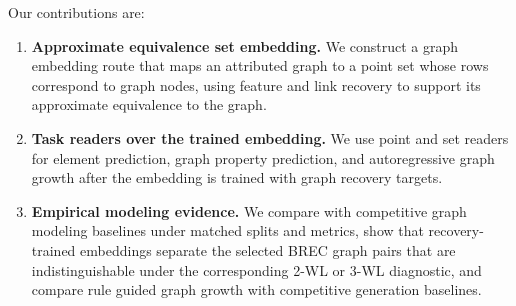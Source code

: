 Our contributions are:
\begin{enumerate}
  \item \textbf{Approximate equivalence set embedding.} We construct a graph
  embedding route that maps an attributed graph to a point set whose rows
  correspond to graph nodes,
  using feature and link recovery to support its approximate equivalence
  to the graph.
  \item \textbf{Task readers over the trained embedding.} We use point and set
  readers for element prediction, graph property prediction, and autoregressive
  graph growth after the embedding is trained with graph recovery targets.
  \item \textbf{Empirical modeling evidence.} We compare \method{} with
  competitive graph modeling baselines under matched splits and metrics, show
  that recovery-trained embeddings separate the selected BREC graph pairs that
  are indistinguishable under the corresponding 2-WL or 3-WL diagnostic, and
  compare rule guided graph growth with competitive generation baselines.
\end{enumerate}
